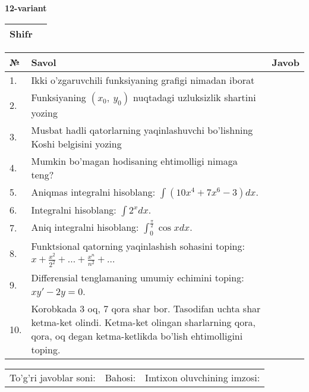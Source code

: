 \documentclass{article}
\begin{document}
  \egroup
  
  \newpage
  
  
  \textbf{12-variant}\\
  
  \bgroup
  \def\arraystretch{1.6} %
  
  \begin{tabular}{|m{5.7cm}|m{9.5cm}|}
  \hline
  Shifr & \\
  \hline
  \end{tabular}
  
  \vspace{1cm}
  
  \begin{tabular}{|m{0.7cm}|m{10cm}|m{4cm}|}
  \hline
  № & Savol & Javob \\
  \hline
  1. & Ikki o'zgaruvchili funksiyaning grafigi nimadan iborat &  \\
  \hline
  2. & Funksiyaning \((x_{0},\ y_{0})\) nuqtadagi uzluksizlik shartini yozing &  \\
  \hline
  3. & Musbat hadli qatorlarning yaqinlashuvchi bo'lishning Koshi belgisini yozing &  \\
  \hline
  4. & Mumkin bo'magan hodisaning ehtimolligi nimaga teng? &  \\
  \hline
  5. & Aniqmas integralni hisoblang: \(\int {\left( 10x^{4} + 7x^{6} - 3 \right)dx}\). &  \\
  \hline
  6. & Integralni hisoblang: \(\int {2^{x}dx}\). &  \\
  \hline
  7. & Aniq integralni hisoblang: \(\int_{0}^{\frac{\pi}{2}}{\cos xdx}\). &  \\
  \hline
  8. & Funktsional qatorning yaqinlashish sohasini toping: \(x + \frac{x^{2}}{2^{2}} + ... + \frac{x^{n}}{n^{2}} + ...\) &  \\
  \hline
  9. & Differensial tenglamaning umumiy echimini toping: \(xy' - 2y = 0\). &  \\
  \hline
  10. & Korobkada 3 oq, 7 qora shar bor. Tasodifan uchta shar ketma-ket olindi. Ketma-ket olingan sharlarning qora, qora, oq degan ketma-ketlikda bo'lish ehtimolligini toping. &  \\
  \hline
  \end{tabular}
  
  \vspace{1cm}
  
  \begin{tabular}{lll}
  To'g'ri javoblar soni: \underline{\hspace{1.5cm}} & 
  Bahosi: \underline{\hspace{1.5cm}} & 
  Imtixon oluvchining imzosi: \underline{\hspace{2cm}} \\
  \end{tabular}
  
\end{document}
